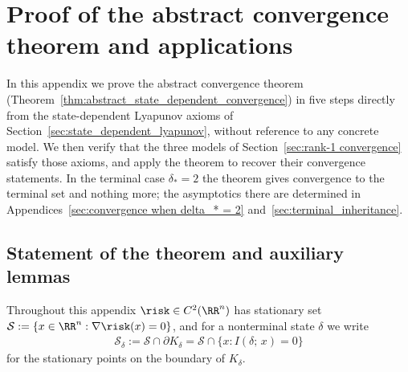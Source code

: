 \documentclass{article}
\begin{document}
\section{Proof of the abstract convergence theorem and applications}
\label{apdx:abstract_convergence}

In this appendix we prove the abstract convergence theorem
(Theorem~\ref{thm:abstract_state_dependent_convergence}) in five steps directly
from the state-dependent Lyapunov axioms of
Section~\ref{sec:state_dependent_lyapunov},
without reference to any concrete model. We then verify that the three models
of Section~\ref{sec:rank-1 convergence} satisfy those axioms, and apply the
theorem to recover their convergence statements. In the terminal case
$\delta_\ast=2$ the theorem gives convergence to the terminal set and nothing
more; the asymptotics there are determined in
Appendices~\ref{sec:convergence when delta_* = 2}
and~\ref{sec:terminal_inheritance}.

\subsection{Statement of the theorem and auxiliary lemmas}
\label{subsec:theorem5_and_auxiliary_lemmas}

Throughout this appendix $\risk\in C^2(\RR^n)$ has stationary set
$\mathcal S:=\{x\in\RR^n:\nabla\risk(x)=0\}$, and for a nonterminal state
$\delta$ we write
\begin{align}
    \mathcal S_\delta
    :=
    \mathcal S\cap\partial K_\delta
    =
    \mathcal S\cap\{x: I(\delta;\,x)=0\}
    \label{eq:stationary_on_boundary}
\end{align}
for the stationary points on the boundary of $K_\delta$.
\end{document}
